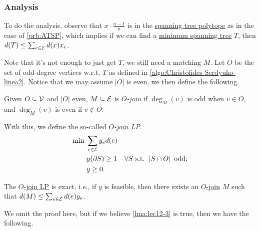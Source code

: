 \subsubsection{Analysis}
To do the analysis, observe that \(x\cdot \frac{n-1}{n}\) is in the \hyperref[eq:spanning-tree-polytope]{spanning tree polytope} as in the case of \autoref{prb:ATSP}, which implies if we can find a \hyperref[prb:min-spanning-tree]{minimum spanning tree} \(T\), then \(d(T) \leq \sum_{e\in \mathcal{\MakeUppercase{e}} } d(x)x_e\).

Note that it's not enough to just get \(T\), we still need a matching \(M\). Let \(O\) be the set of odd-degree vertices w.r.t. \(T\) as defined in \autoref{algo:Christofides-Serdyuko-linea2}. Notice that we may assume \(\left\vert O \right\vert \) is even, we then define the following.

\begin{definition}[\(O\)-join]\label{def:O-join}
	Given \(O\subseteq \mathcal{\MakeUppercase{v}} \) and \(\left\vert O \right\vert \) even, \(M \subseteq \mathcal{\MakeUppercase{e}} \) is \emph{\(O\)-join} if \(\deg_M(v)\) is odd when \(v\in O\), and \(\deg_M(v)\) is even if \(v \notin O\).
\end{definition}

With this, we define the so-called \emph{\hyperref[def:O-join]{\(O\)-join} LP}.
\begin{equation}\label{eq:O-join-LP}
	\begin{aligned}
		\min~ & \sum_{e\in \mathcal{\MakeUppercase{e}} } y_e d(e)                                                                      \\
		      & y(\partial S) \geq 1                              & \forall S\text{ s.t. }\left\vert S \cap O \right\vert \text{ odd}; \\
		      & y\geq 0.
	\end{aligned}
\end{equation}

\begin{lemma}\label{lma:lec12-3}
	The \hyperref[eq:O-join-LP]{\(O\)-join LP} is exact, i.e., if \(y\) is feasible, then there exists an \hyperref[def:O-join]{\(O\)-join} \(M\) such that \(d(M) \leq \sum_{e\in \mathcal{\MakeUppercase{e}} } d(e)y_e\).
\end{lemma}
We omit the proof here, but if we believe \autoref{lma:lec12-3} is true, then we have the following.

